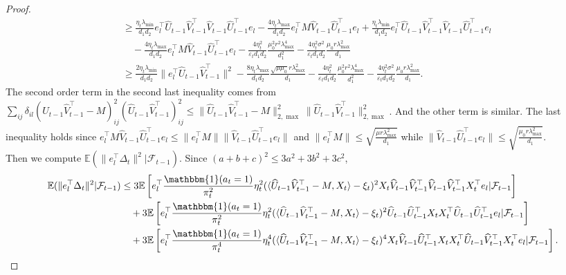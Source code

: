 \documentclass[12pt]{article}
\newcommand{\inp}[2]{\langle #1,#2\rangle}
\def\EE{{\mathbb E}}
\theoremstyle{plain}
\begin{document}
\begin{proof}
\begin{align*}
    &\geq \frac{\eta_t\lambda_{\min}}{d_1d_2}e_l^{\top}\widehat{U}_{t-1}\widehat{V}_{t-1}^{\top}\widehat{V}_{t-1}\widehat{U}_{t-1}^{\top}e_l - \frac{4\eta_t\lambda_{\max}}{d_1d_2}e_l^{\top}M\widehat{V}_{t-1}\widehat{U}_{t-1}^{\top}e_l + \frac{\eta_t\lambda_{\min}}{d_1d_2}e_l^{\top}\widehat{U}_{t-1}\widehat{V}_{t-1}^{\top}\widehat{V}_{t-1}\widehat{U}_{t-1}^{\top}e_l \\ &\quad - \frac{4\eta_t\lambda_{\max}}{d_1d_2}e_l^{\top}M\widehat{V}_{t-1}\widehat{U}_{t-1}^{\top}e_l  - \frac{4\eta_t^2}{\varepsilon_t d_1d_2}\frac{\mu_0^2r^2\lambda_{\max}^4}{d_1^2} - \frac{4\eta_t^2\sigma^2}{\varepsilon_t d_1d_2}\frac{\mu_0r\lambda_{\max}^2}{d_1}\\
    &\geq \frac{2\eta_t\lambda_{\min}}{d_1d_2}\|e_l^{\top}\widehat{U}_{t-1}\widehat{V}_{t-1}^{\top}\|^2 - \frac{8\eta_t\lambda_{\max}}{d_1d_2}\frac{\sqrt{\mu\mu_0} r\lambda_{\max}^2}{d_1}  - \frac{4\eta_t^2}{\varepsilon_t d_1d_2}\frac{\mu_0^2r^2\lambda_{\max}^4}{d_1^2} - \frac{4\eta_t^2\sigma^2}{\varepsilon_t d_1d_2}\frac{\mu_0r\lambda_{\max}^2}{d_1}.
\end{align*}
The second order term in the second last inequality comes from $\sum_{ij}\delta_{il}(\widehat{U}_{t-1}\widehat{V}_{t-1}^{\top} - M)_{ij}^2(\widehat{U}_{t-1}\widehat{V}_{t-1}^{\top})_{ij}^2\leq \|\widehat{U}_{t-1}\widehat{V}_{t-1}^{\top} - M\|_{2,\max}^2\|\widehat{U}_{t-1}\widehat{V}_{t-1}^{\top}\|_{2,\max}^2$. And the other term is similar. The last inequality holds since $e_l^{\top}M\widehat{V}_{t-1}\widehat{U}_{t-1}^{\top}e_l\leq \|e_l^{\top}M\|\|\widehat{V}_{t-1}\widehat{U}_{t-1}^{\top}e_l\|$ and $\|e_l^{\top}M\|\leq \sqrt{\frac{\mu r\lambda_{\max}^2}{d_1}}$ while $\|\widehat{V}_{t-1}\widehat{U}_{t-1}^{\top}e_l\|\leq \sqrt{\frac{\mu_0r\lambda_{\max}^2}{d_1}}$.\\
Then we compute $\EE(\|e_l^{\top}\Delta_{t}\|^2|\mathcal{F}_{t-1})$. Since $(a+b+c)^2\leq 3a^2+3b^2+3c^2$,
\begin{align*}
    \EE(\|e_l^{\top}\Delta_{t}\|^2|\mathcal{F}_{t-1})&\leq 3\EE\left[e_l^{\top} \frac{\mathbbm{1}(a_t=1)}{\pi_t^2}\eta_t^2(\inp{\widehat{U}_{t-1}\widehat{V}_{t-1}^{\top} - M}{X_t}-\xi_t)^2X_t\widehat{V}_{t-1}\widehat{V}_{t-1}^{\top}\widehat{V}_{t-1}\widehat{V}_{t-1}^{\top}X_t^{\top} e_l|\mathcal{F}_{t-1}\right] \\ &\quad + 3\EE\left[e_l^{\top} \frac{\mathbbm{1}(a_t=1)}{\pi_t^2}\eta_t^2(\inp{\widehat{U}_{t-1}\widehat{V}_{t-1}^{\top}- M}{X_t}-\xi_t)^2\widehat{U}_{t-1}\widehat{U}_{t-1}^{\top}X_tX_t^{\top}\widehat{U}_{t-1}\widehat{U}_{t-1}^{\top} e_l|\mathcal{F}_{t-1}\right] \\ &\quad + 3\EE\left[e_l^{\top} \frac{\mathbbm{1}(a_t=1)}{\pi_t^4}\eta_t^4(\inp{\widehat{U}_{t-1}\widehat{V}_{t-1}^{\top}- M}{X_t}-\xi_t)^4X_t\widehat{V}_{t-1}\widehat{U}_{t-1}^{\top}X_tX_t^{\top}\widehat{U}_{t-1}\widehat{V}_{t-1}^{\top}X_t^{\top}  e_l|\mathcal{F}_{t-1} \right].                                       

\end{align*}
\end{proof}
\end{document}
